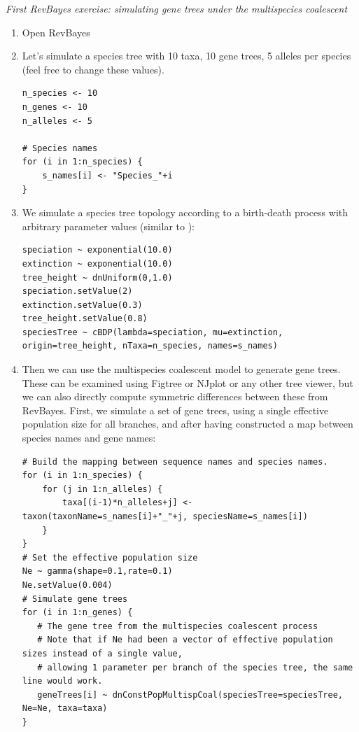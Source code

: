 \documentclass[11pt]{article}
\begin{document}
{\begin{framed}

\begin{center}
\emph{First RevBayes exercise: simulating gene trees under the multispecies coalescent}
\end{center}
\begin{enumerate}
\item Open RevBayes
\item Let's simulate a species tree with 10 taxa, 10 gene trees, 5 alleles per species (feel free to change these values).
{\tt \begin{snugshade*}
\begin{lstlisting}
n_species <- 10
n_genes <- 10
n_alleles <- 5

# Species names
for (i in 1:n_species) {
	s_names[i] <- "Species_"+i
}
\end{lstlisting}
\end{snugshade*}}
\item We simulate a species tree topology according to a birth-death process with arbitrary parameter values (similar to \citet{Leache2011}):
{\tt \begin{snugshade*}
\begin{lstlisting}
speciation ~ exponential(10.0)
extinction ~ exponential(10.0)
tree_height ~ dnUniform(0,1.0)
speciation.setValue(2)
extinction.setValue(0.3)
tree_height.setValue(0.8)
speciesTree ~ cBDP(lambda=speciation, mu=extinction, origin=tree_height, nTaxa=n_species, names=s_names)
\end{lstlisting}
\end{snugshade*}}
\item Then we can use the multispecies coalescent model to generate gene trees. These can be examined using Figtree or NJplot or any other tree viewer, but we can also directly compute symmetric differences between these from RevBayes. First, we simulate a set of gene trees, using a single effective population size for all branches, and after having constructed a map between species names and gene names:
{\tt \begin{snugshade*}
\begin{lstlisting}
# Build the mapping between sequence names and species names.
for (i in 1:n_species) {
	for (j in 1:n_alleles) {
		taxa[(i-1)*n_alleles+j] <- taxon(taxonName=s_names[i]+"_"+j, speciesName=s_names[i])
	}
}
# Set the effective population size
Ne ~ gamma(shape=0.1,rate=0.1)
Ne.setValue(0.004)
# Simulate gene trees
for (i in 1:n_genes) {
   # The gene tree from the multispecies coalescent process
   # Note that if Ne had been a vector of effective population sizes instead of a single value, 
   # allowing 1 parameter per branch of the species tree, the same line would work.
   geneTrees[i] ~ dnConstPopMultispCoal(speciesTree=speciesTree, Ne=Ne, taxa=taxa)
}
\end{lstlisting}
\end{snugshade*}}


\end{enumerate}
\end{framed}}
\end{document}

